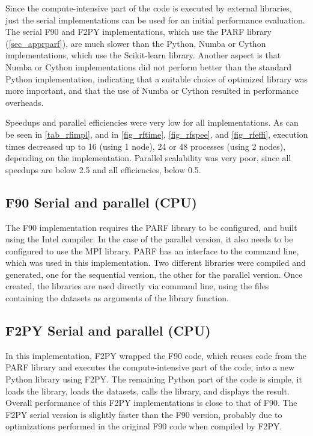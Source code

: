 Since the compute-intensive part of the code is executed by external libraries, just the serial implementations can be used for an initial performance evaluation. The serial F90 and F2PY implementations, which use the PARF library (\autoref {sec_apprparf}), are much slower than the Python, Numba or Cython implementations, which use the Scikit-learn library. Another aspect is that Numba or Cython implementations did not perform better than the standard Python implementation, indicating that a suitable choice of optimized library was more important, and that the use of Numba or Cython resulted in performance overheads.

Speedups and parallel efficiencies were very low for all implementations. As can be seen in \autoref {tab_rfimpl}, and in \autoref {fig_rftime}, \autoref {fig_rfspee}, and \autoref {fig_rfeffi}, execution times decreased up to 16 (using 1 node), 24 or 48 processes (using 2 nodes), depending on the implementation. Parallel scalability was very poor, since all speedups are below 2.5 and all efficiencies, below 0.5.
 
%
%
%
\subsection{F90 Serial and parallel (CPU)}
\label{sec_rff90}

The F90 implementation requires the PARF library to be configured, and built using the Intel compiler. In the case of the parallel version, it also needs to be configured to use the MPI library. PARF has an interface to the command line, which was used in this implementation. Two different libraries were compiled and generated, one for the sequential version, the other for the parallel version. Once created, the libraries are used directly via command line, using the files containing the datasets as arguments of the library function. 

%
%
%
\subsection{F2PY Serial and parallel (CPU)}
\label{sec_rff2py}

In this implementation, F2PY wrapped the F90 code, which reuses code from the PARF library and executes the compute-intensive part of the code, into a new Python library using F2PY. The remaining Python part of the code is simple, it loads the library, loads the datasets, calls the library, and displays the result. Overall performance of this F2PY implementations is close to that of F90. The F2PY serial version is slightly faster than the F90 version, probably due to optimizations performed in the original F90 code when compiled by F2PY.

